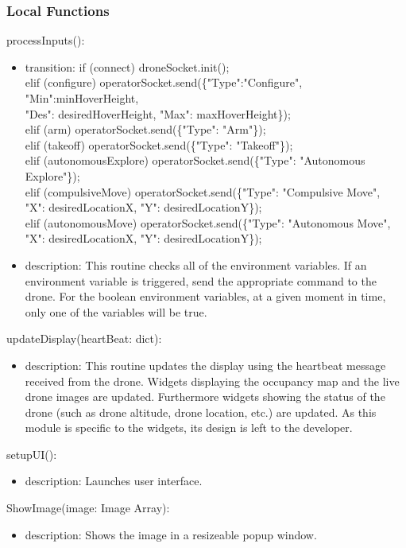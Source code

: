 \documentclass[12pt, titlepage]{article}
\begin{document}
\subsubsection{Local Functions}
\noindent processInputs():
\begin{itemize}
\item transition:
if (connect) droneSocket.init();\\
elif (configure) operatorSocket.send(\{"Type":"Configure", "Min":minHoverHeight, \\"Des": desiredHoverHeight, "Max": maxHoverHeight\});\\
 elif (arm) operatorSocket.send(\{"Type": "Arm"\});\\
 elif (takeoff) operatorSocket.send(\{"Type": "Takeoff"\});\\
 elif (autonomousExplore) operatorSocket.send(\{"Type": "Autonomous Explore"\});\\
 elif (compulsiveMove) operatorSocket.send(\{"Type": "Compulsive Move", \\ "X": desiredLocationX, "Y": desiredLocationY\});\\
 elif (autonomousMove) operatorSocket.send(\{"Type": "Autonomous Move", \\ "X": desiredLocationX, "Y": desiredLocationY\});\\
\item description: This routine checks all of the environment variables. If an environment variable is triggered, send the appropriate command to the drone. For the boolean environment variables, at a given moment in time, only one of the variables will be true.
\end{itemize}

\noindent updateDisplay(heartBeat: dict):
\begin{itemize}
\item description: This routine updates the display using the heartbeat message received from the drone. Widgets displaying the occupancy map and the live drone images are updated. Furthermore widgets showing the status of the drone (such as drone altitude, drone location, etc.) are updated. As this module is specific to the widgets, its design is left to the developer.
\end{itemize}
\noindent setupUI():
\begin{itemize}
\item description: Launches user interface.
\end{itemize}
\noindent ShowImage(image: Image Array):
\begin{itemize}
\item description: Shows the image in a resizeable popup window.
\end{itemize}
\newpage
\end{document}
